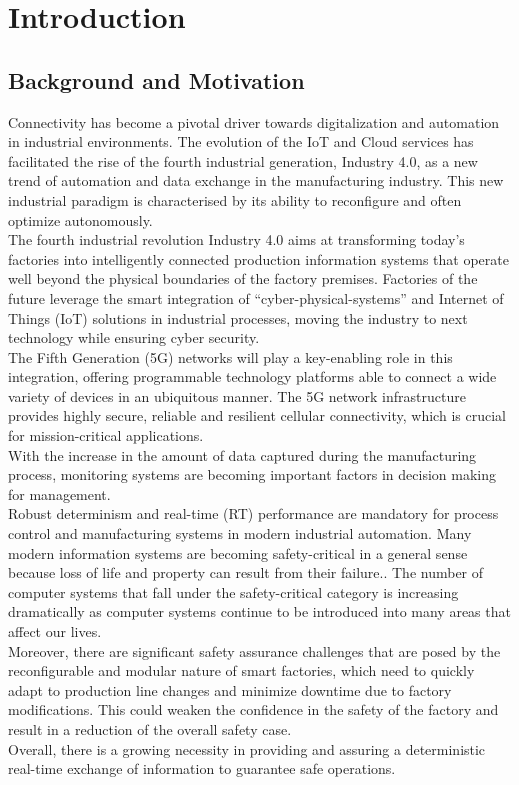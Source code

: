 \cleardoublepage
\chapter{Introduction}
\minitoc\label{sec:introduction}\vspace{.5cm}

\section{Background and Motivation}

Connectivity has become a pivotal driver towards digitalization and automation in industrial environments. 
The evolution of the IoT and Cloud services has facilitated the rise of the fourth industrial generation, Industry 4.0, as a new trend of automation and data exchange in the manufacturing industry.
This new industrial paradigm is characterised by its ability to reconfigure and often optimize autonomously.\\
The fourth industrial revolution Industry 4.0 aims at transforming today’s factories into intelligently connected production information systems that operate well beyond the physical boundaries of the factory premises.
Factories of the future leverage the smart integration of “cyber-physical-systems” and Internet of Things (IoT) solutions in industrial processes\cite{7883994}, moving the industry to next technology while ensuring cyber security.\\
The Fifth Generation (5G) networks will play a key-enabling role in this integration, offering programmable technology platforms able to connect a wide variety of devices in an ubiquitous manner.
The 5G network infrastructure provides highly secure, reliable and resilient cellular connectivity, which is crucial for mission-critical applications.\\
With the increase in the amount of data captured during the manufacturing process, monitoring systems are becoming important factors in decision making for management.\\

Robust determinism and real-time (RT) performance are mandatory for process control and manufacturing systems in modern industrial automation.
Many modern information systems are becoming safety-critical in a general sense because loss of life and property can result from their failure.\cite{1007998}.
The number of computer systems that fall under the safety-critical category is increasing dramatically as computer systems continue to be introduced into many areas that affect our lives.\\
Moreover, there are significant safety assurance challenges that are posed by the reconfigurable and modular nature of smart factories,
which need to quickly adapt to production line changes and minimize downtime due to factory modifications.
This could weaken the confidence in the safety of the factory and result in a reduction of the overall safety case.\\
Overall, there is a growing necessity in providing and assuring a deterministic real-time exchange of information to guarantee safe operations.\\

